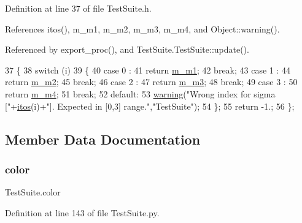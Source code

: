 Definition at line 37 of file Test\+Suite.\+h.



References itos(), m\+\_\+m1, m\+\_\+m2, m\+\_\+m3, m\+\_\+m4, and Object\+::warning().



Referenced by export\+\_\+proc(), and Test\+Suite.\+Test\+Suite\+::update().


\begin{DoxyCode}
37                         \{
38     \textcolor{keywordflow}{switch} (i) 
39     \{
40     \textcolor{keywordflow}{case} 0 :
41       \textcolor{keywordflow}{return} \hyperlink{classTestSuite_a853a92fd3e82371d19993739c2bf1236}{m\_m1};
42       \textcolor{keywordflow}{break};
43     \textcolor{keywordflow}{case} 1 :
44       \textcolor{keywordflow}{return} \hyperlink{classTestSuite_a710aa6029d3d0b47b61a828a472f7546}{m\_m2};
45       \textcolor{keywordflow}{break};
46     \textcolor{keywordflow}{case} 2 :
47       \textcolor{keywordflow}{return} \hyperlink{classTestSuite_acbc062956d67a5f47dfb74286a390300}{m\_m3};
48       \textcolor{keywordflow}{break};
49     \textcolor{keywordflow}{case} 3 :
50       \textcolor{keywordflow}{return} \hyperlink{classTestSuite_ac3d39b72dd5fce4c48eb39ea56be3e36}{m\_m4};
51       \textcolor{keywordflow}{break};
52     \textcolor{keywordflow}{default}:
53       \hyperlink{classObject_a65cd4fda577711660821fd2cd5a3b4c9}{warning}(\textcolor{stringliteral}{"Wrong index for sigma ["}+\hyperlink{Tools_8h_af330027dbdafb9a30768b3613c553e60}{itos}(i)+\textcolor{stringliteral}{"]. Expected in [0,3] range."},\textcolor{stringliteral}{"TestSuite"});
54     \};
55     \textcolor{keywordflow}{return} -1.;
56   \};
\end{DoxyCode}


\subsection{Member Data Documentation}
\mbox{\label{classTestSuite_a3e108594545394553993c4e2c45d27de}} 
\subsubsection{\texorpdfstring{color}{color}}
{\footnotesize\ttfamily Test\+Suite.\+color}



Definition at line 143 of file Test\+Suite.\+py.

